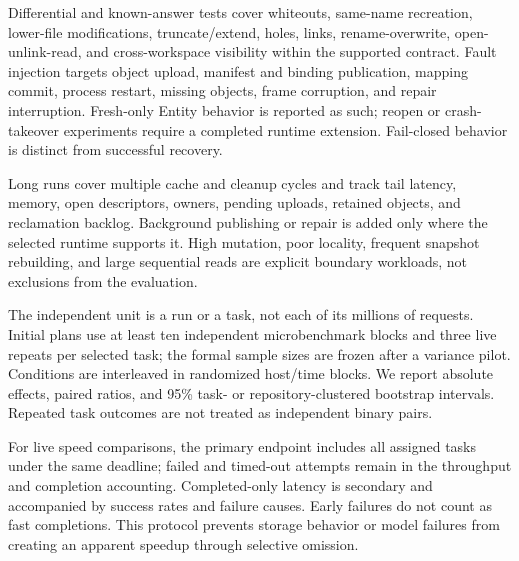  Differential and known-answer tests cover whiteouts, same-name
recreation, lower-file modifications, truncate/extend, holes, links,
rename-overwrite, open-unlink-read, and cross-workspace visibility within
the supported contract. Fault injection targets object upload, manifest
and binding publication, mapping commit, process restart, missing objects,
frame corruption, and repair interruption. Fresh-only Entity behavior is
reported as such; reopen or crash-takeover experiments require a completed
runtime extension. Fail-closed behavior is distinct from successful recovery.

Long runs cover multiple cache and cleanup cycles and track tail latency,
memory, open descriptors, owners, pending uploads, retained objects, and
reclamation backlog. Background publishing or repair is added only where
the selected runtime supports it. High mutation, poor locality, frequent
snapshot rebuilding, and large sequential reads are explicit boundary
workloads, not exclusions from the evaluation.

The independent unit is a run or a task, not each of its millions of
requests. Initial plans use at least ten independent microbenchmark blocks
and three live repeats per selected task; the formal sample sizes are
frozen after a variance pilot. Conditions are interleaved in randomized
host/time blocks. We report absolute effects, paired ratios, and 95\%
task- or repository-clustered bootstrap intervals. Repeated task outcomes
are not treated as independent binary pairs.

For live speed comparisons, the primary endpoint includes all assigned
tasks under the same deadline; failed and timed-out attempts remain in the
throughput and completion accounting. Completed-only latency is secondary
and accompanied by success rates and failure causes. Early failures do not
count as fast completions. This protocol prevents storage behavior or model
failures from creating an apparent speedup through selective omission.
